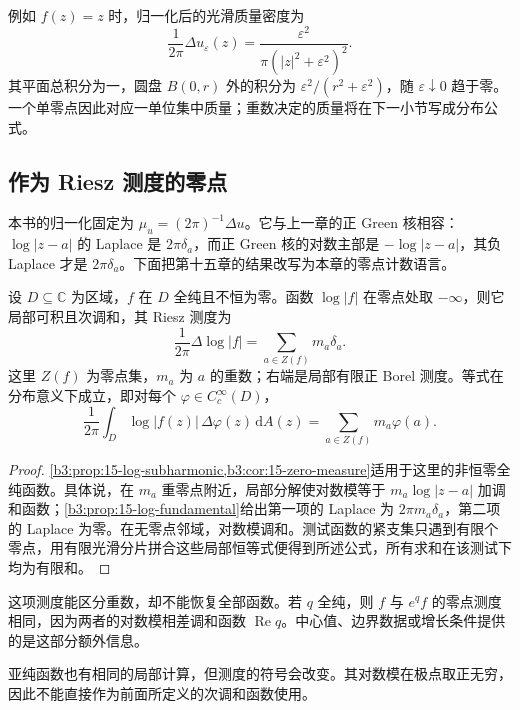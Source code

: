 例如 \(f(z)=z\) 时，归一化后的光滑质量密度为
\[
 \frac1{2\pi}\Delta u_\varepsilon(z)
 =\frac{\varepsilon^2}{\pi(|z|^2+\varepsilon^2)^2}.
\]
其平面总积分为一，圆盘 \(B(0,r)\) 外的积分为 \(\varepsilon^2/(r^2+\varepsilon^2)\)，随 \(\varepsilon\downarrow0\) 趋于零。一个单零点因此对应一单位集中质量；重数决定的质量将在下一小节写成分布公式。

\subsection{作为 Riesz 测度的零点}
\label{b3:subsec:180302}

本书的归一化固定为 \(\mu_u=(2\pi)^{-1}\Delta u\)。它与上一章的正 Green 核相容：\(\log|z-a|\) 的 Laplace 是 \(2\pi\delta_a\)，而正 Green 核的对数主部是 \(-\log|z-a|\)，其负 Laplace 才是 \(2\pi\delta_a\)。下面把第十五章的结果改写为本章的零点计数语言。

\begin{proposition}[对数模的零点测度]\label{b3:prop:18-zero-measure}
设 \(D\subseteq\mathbb C\) 为区域，\(f\) 在 \(D\) 全纯且不恒为零。函数 \(\log|f|\) 在零点处取 \(-\infty\)，则它局部可积且次调和，其 Riesz 测度为
\begin{equation}\label{b3:eq:18-zero-riesz-measure}
 \frac1{2\pi}\Delta\log|f|
 =\sum_{a\in Z(f)}m_a\delta_a.
\end{equation}
这里 \(Z(f)\) 为零点集，\(m_a\) 为 \(a\) 的重数；右端是局部有限正 Borel 测度。等式在分布意义下成立，即对每个 \(\varphi\in C_c^\infty(D)\)，
\[
 \frac1{2\pi}\int_D\log|f(z)|\,\Delta\varphi(z)\,\mathrm dA(z)
 =\sum_{a\in Z(f)}m_a\varphi(a).
\]
\end{proposition}
\begin{proof}
\cref{b3:prop:15-log-subharmonic,b3:cor:15-zero-measure}适用于这里的非恒零全纯函数。具体说，在 \(m_a\) 重零点附近，局部分解使对数模等于 \(m_a\log|z-a|\) 加调和函数；\cref{b3:prop:15-log-fundamental}给出第一项的 Laplace 为 \(2\pi m_a\delta_a\)，第二项的 Laplace 为零。在无零点邻域，对数模调和。测试函数的紧支集只遇到有限个零点，用有限光滑分片拼合这些局部恒等式便得到所述公式，所有求和在该测试下均为有限和。
\end{proof}

这项测度能区分重数，却不能恢复全部函数。若 \(q\) 全纯，则 \(f\) 与 \(e^qf\) 的零点测度相同，因为两者的对数模相差调和函数 \(\operatorname{Re}q\)。中心值、边界数据或增长条件提供的是这部分额外信息。

\ProseParagraphBreak

亚纯函数也有相同的局部计算，但测度的符号会改变。其对数模在极点取正无穷，因此不能直接作为前面所定义的次调和函数使用。

